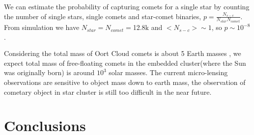 \documentclass[usenatbib]{mnras}
\begin{document}
We can estimate the probability of capturing comets for a single star by counting the number of single stars, single comets and star-comet binaries, $p = \frac{N_{s-c}}{N_{star}N_{comet}} $. From simulation we have $ N_{star} = N_{comet} = $12.8k and $<N_{s-c}> \sim 1$, so $ p \sim10^{-8}$.

Considering the total mass of Oort Cloud comets is about 5 Earth masses \citep{Morbidelli:2005aa}, we expect total mass of free-floating comets in the embedded cluster(where the Sun was originally born) is around $10^{3}$ solar masses. The current micro-lensing observations are sensitive to object mass down to earth mass, the observation of cometary object in star cluster is still too difficult in the near future.











\section{Conclusions}\label{section:conclusions}

%
\end{document}

